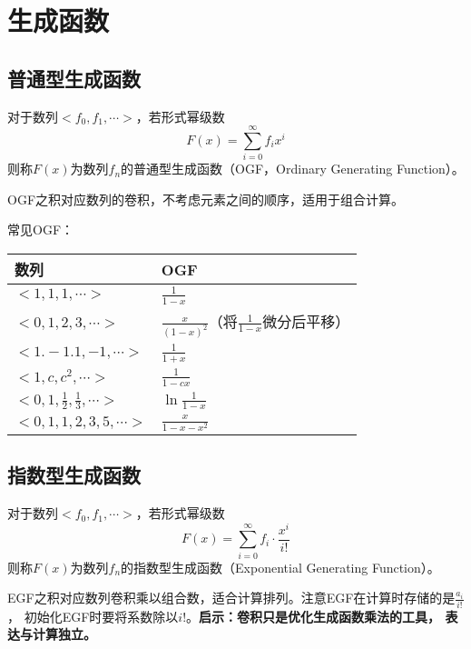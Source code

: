 \section{生成函数}\label{GF}
\subsection{普通型生成函数}
对于数列$<f_0,f_1,\cdots>$，若形式幂级数
\begin{displaymath}
	F(x)=\sum_{i=0}^\infty{f_ix^i}
\end{displaymath}
则称$F(x)$为数列${f_n}$的普通型生成函数（OGF，Ordinary Generating Function）。

OGF之积对应数列的卷积，不考虑元素之间的顺序，适用于组合计算。

常见OGF：

\begin{tabular}{|l|l|}
	\hline
	数列                                   & OGF                                          \\
	\hline
	$<1,1,1,\cdots>$                       & $\frac{1}{1-x}$                              \\
	\hline
	$<0,1,2,3,\cdots>$                       & $\frac{x}{(1-x)^2}$（将$\frac{1}{1-x}$微分后平移） \\
	\hline
	$<1.-1.1,-1,\cdots>$                   & $\frac{1}{1+x}$    \\
	\hline
	$<1,c,c^2,\cdots>$                     & $\frac{1}{1-cx}$                             \\
	\hline
	$<0,1,\frac{1}{2},\frac{1}{3},\cdots>$ & $\ln\frac{1}{1-x}$                           \\
	\hline
	$<0,1,1,2,3,5,\cdots>$ & $\frac{x}{1-x-x^2}$\\
	\hline
\end{tabular}
\subsection{指数型生成函数}
对于数列$<f_0,f_1,\cdots>$，若形式幂级数
\begin{displaymath}
	F(x)=\sum_{i=0}^\infty{f_i\cdot\frac{x^i}{i!}}
\end{displaymath}
则称$F(x)$为数列${f_n}$的指数型生成函数（Exponential Generating Function）。

EGF之积对应数列卷积乘以组合数，适合计算排列。注意EGF在计算时存储的是$\frac{a_i}{i!}$，
初始化EGF时要将系数除以$i!$。{\bfseries 启示：卷积只是优化生成函数乘法的工具，
表达与计算独立。}

